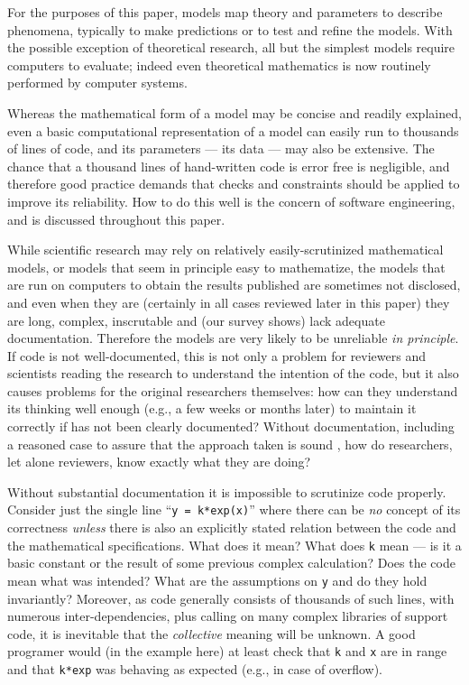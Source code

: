 For the purposes of this paper, models map theory and parameters to describe phenomena, typically to make predictions or to test and refine the models. With the possible exception of theoretical research, all but the simplest models require computers to evaluate; indeed even theoretical mathematics is now routinely performed by computer systems.

Whereas the mathematical form of a model may be concise and readily explained, even a basic computational representation of a model can easily run to thousands of lines of code, and its parameters --- its data --- may also be extensive. The chance that a thousand lines of hand-written code is error free is negligible, and therefore good practice demands that checks and constraints should be applied to improve its reliability. How to do this well is the concern of software engineering, and is discussed throughout this paper. 

While scientific research may rely on relatively easily-scrutinized mathematical models, or models that seem in principle easy to mathematize, the models that are run on computers to obtain the results published are sometimes not disclosed, and even when they are (certainly in all cases reviewed later in this paper) they are long, complex, inscrutable and (our survey shows) lack adequate documentation. Therefore the models are very likely to be unreliable \emph{in principle}. If code is not well-documented, this is not only a problem for reviewers and scientists reading the research to understand the intention of the code, but it also causes problems for the original researchers themselves: how can they understand its thinking well enough (e.g., a few weeks or months later) to maintain it correctly if has not been clearly documented? Without documentation, including a reasoned case to assure that the approach taken is sound \cite{assurance-case}, how do researchers, let alone reviewers, know exactly what they are doing?

Without substantial documentation it is impossible to scrutinize code properly. Consider just the single line ``\texttt{y = k*exp(x)}'' where there can be \emph{no\/} concept of its correctness \emph{unless\/} there is also an explicitly stated relation between the code and the mathematical specifications. What does it mean? What does \texttt{k} mean --- is it a basic constant or the result of some previous complex calculation? Does the code mean what was intended? What are the assumptions on \texttt{y} and do they hold invariantly? Moreover, as code generally consists of thousands of such lines, with numerous inter-dependencies, plus calling on many complex libraries of support code, it is inevitable that the \emph{collective\/} meaning will be unknown. A good programer would (in the example here) at least check that \texttt{k} and \texttt{x} are in range and that \texttt{k*exp} was behaving as expected (e.g., in case of overflow).

